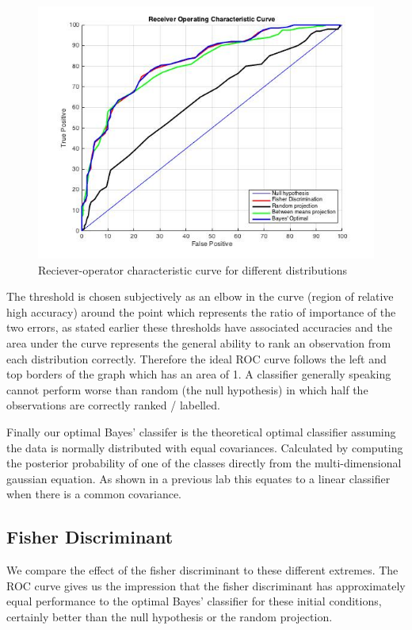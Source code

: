 \documentclass[a4paper,11pt, twocolumn]{article}
\begin{document}
\begin{figure}[ht]
	\includegraphics[width=0.7\linewidth]{ROCcurve.jpg}
	\centering
	\caption{Reciever-operator characteristic curve for different distributions}
    \label{figure:ROCcurve}
\end{figure}

The threshold is chosen subjectively as an elbow in the curve (region of relative high accuracy) around the point which represents the ratio of importance of the two errors, as stated earlier these thresholds have associated accuracies and the area under the curve represents the general ability to rank an observation from each distribution correctly. Therefore the ideal ROC curve follows the left and top borders of the graph which has an area of 1. A classifier generally speaking cannot perform worse than random (the null hypothesis) in which half the observations are correctly ranked / labelled. 

Finally our optimal Bayes' classifer is the theoretical optimal classifier assuming the data is normally distributed with equal covariances. Calculated by computing the posterior probability of one of the classes directly from the multi-dimensional gaussian equation. As shown in a previous lab this equates to a linear classifier when there is a common covariance.

\subsection{Fisher Discriminant}
We compare the effect of the fisher discriminant to these different extremes. The ROC curve gives us the impression that the fisher discriminant has approximately equal performance to the optimal Bayes' classifier for these initial conditions, certainly better than the null hypothesis or the random projection. 
\end{document}
